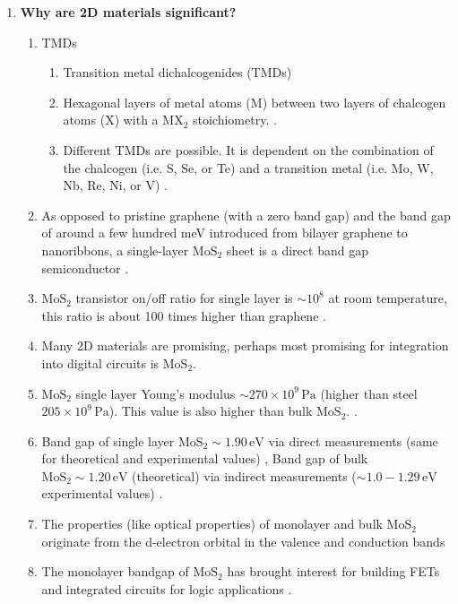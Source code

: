 \documentclass{article}
\begin{document}
\begin{enumerate}
\begin{enumerate}
		\end{enumerate} %
	\item{\textbf{Why are 2D materials significant?}}

		\begin{enumerate} %
			\item{TMDs}
				\begin{enumerate}
					\item{Transition metal dichalcogenides (TMDs)}
					\item{Hexagonal layers of metal atoms ($\mathrm{M}$) between two layers of chalcogen atoms ($\mathrm{X}$) with a $\mathrm{MX}_2$ stoichiometry. \cite{grapheneLike2Dreview2013}.}
					\item{Different TMDs are possible. It is dependent on the combination of the chalcogen (i.e. S, Se, or Te) and a transition metal (i.e. Mo, W, Nb, Re, Ni, or V) \cite{WilsonTMDs1969, grapheneLike2Dreview2013}.}
				\end{enumerate}
	
			\item{As opposed to pristine graphene (with a zero band gap) and the band gap of around a few hundred meV introduced from bilayer graphene to nanoribbons, a single-layer $\mathrm{MoS}_2$ sheet is a direct band gap semiconductor \cite{grapheneLike2Dreview2013}. }
			\item{$\mathrm{MoS}_2$ transistor on/off ratio for single layer is $\sim 10^8$ at room temperature, this ratio is about 100 times higher than graphene \cite{grapheneLike2Dreview2013, novoselovEtAl2004}.}
			\item{Many 2D materials are promising, perhaps most promising for integration into digital circuits is $\mathrm{MoS}_2$.}
			\item{$\mathrm{MoS}_2$ single layer Young's modulus $\sim 270 \times 10^9 \mathrm{\, Pa}$ (higher than steel $205 \times 10^9 \mathrm{\, Pa}$). This value is also higher than bulk $\mathrm{MoS}_2$. \cite{singleLayerMoS2electronics2015}.}
			\item{Band gap of single layer $\mathrm{MoS}_2 \sim 1.90 \mathrm{\, eV}$ via direct measurements (same for theoretical and experimental values) \cite{Fortin1982}, Band gap of bulk $\mathrm{MoS}_2\sim 1.20 \mathrm{\, eV}$ (theoretical) via indirect measurements ($\sim 1.0-1.29 \mathrm{\, eV}$ experimental values) \cite{grapheneLike2Dreview2013, Mak2010, Gourmelon1997}.}
			\item{The properties (like optical properties) of monolayer and bulk $\mathrm{MoS}_2$ originate from the d-electron orbital in the valence and conduction bands \cite{Mak2010, Splendiani2010}}
			\item{The monolayer bandgap of $\mathrm{MoS}_2$ has brought interest for building FETs and integrated circuits for logic applications \cite{Radisavljevic2011, Wang2012}.}


\end{enumerate}
\end{enumerate}
\end{document}
